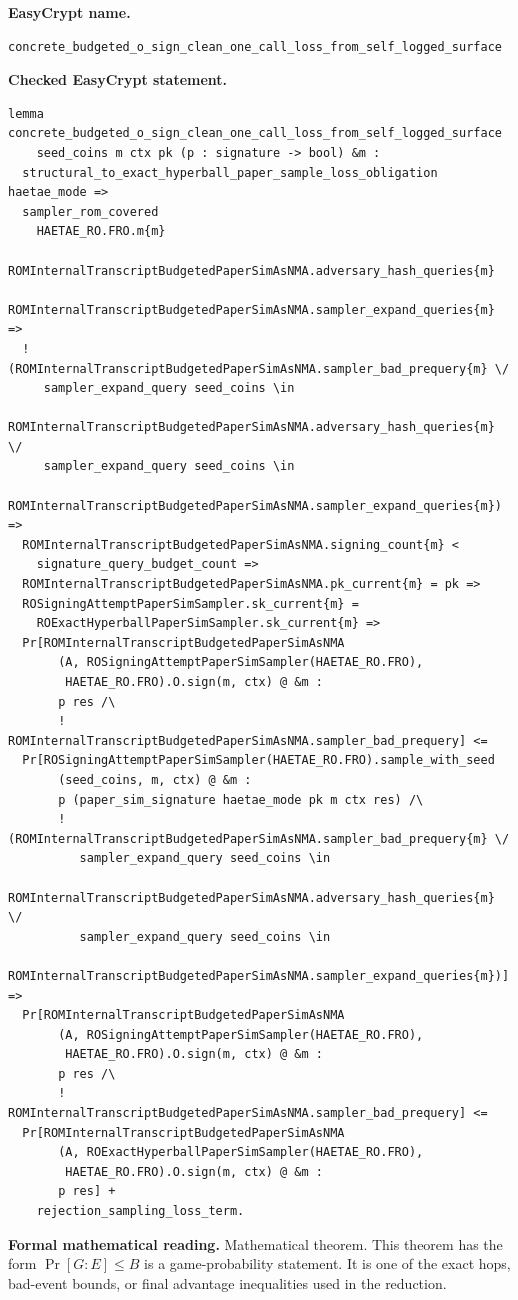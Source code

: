 \begin{formaltheorem}
\noindent\textbf{EasyCrypt name.}
\begin{lstlisting}[language=EasyCrypt,basicstyle=\ttfamily\scriptsize]
concrete_budgeted_o_sign_clean_one_call_loss_from_self_logged_surface
\end{lstlisting}
\noindent\textbf{Checked EasyCrypt statement.}
\begin{lstlisting}[language=EasyCrypt,basicstyle=\ttfamily\scriptsize]
lemma concrete_budgeted_o_sign_clean_one_call_loss_from_self_logged_surface
    seed_coins m ctx pk (p : signature -> bool) &m :
  structural_to_exact_hyperball_paper_sample_loss_obligation haetae_mode =>
  sampler_rom_covered
    HAETAE_RO.FRO.m{m}
    ROMInternalTranscriptBudgetedPaperSimAsNMA.adversary_hash_queries{m}
    ROMInternalTranscriptBudgetedPaperSimAsNMA.sampler_expand_queries{m} =>
  ! (ROMInternalTranscriptBudgetedPaperSimAsNMA.sampler_bad_prequery{m} \/
     sampler_expand_query seed_coins \in
       ROMInternalTranscriptBudgetedPaperSimAsNMA.adversary_hash_queries{m} \/
     sampler_expand_query seed_coins \in
       ROMInternalTranscriptBudgetedPaperSimAsNMA.sampler_expand_queries{m}) =>
  ROMInternalTranscriptBudgetedPaperSimAsNMA.signing_count{m} <
    signature_query_budget_count =>
  ROMInternalTranscriptBudgetedPaperSimAsNMA.pk_current{m} = pk =>
  ROSigningAttemptPaperSimSampler.sk_current{m} =
    ROExactHyperballPaperSimSampler.sk_current{m} =>
  Pr[ROMInternalTranscriptBudgetedPaperSimAsNMA
       (A, ROSigningAttemptPaperSimSampler(HAETAE_RO.FRO),
        HAETAE_RO.FRO).O.sign(m, ctx) @ &m :
       p res /\
       ! ROMInternalTranscriptBudgetedPaperSimAsNMA.sampler_bad_prequery] <=
  Pr[ROSigningAttemptPaperSimSampler(HAETAE_RO.FRO).sample_with_seed
       (seed_coins, m, ctx) @ &m :
       p (paper_sim_signature haetae_mode pk m ctx res) /\
       ! (ROMInternalTranscriptBudgetedPaperSimAsNMA.sampler_bad_prequery{m} \/
          sampler_expand_query seed_coins \in
            ROMInternalTranscriptBudgetedPaperSimAsNMA.adversary_hash_queries{m} \/
          sampler_expand_query seed_coins \in
            ROMInternalTranscriptBudgetedPaperSimAsNMA.sampler_expand_queries{m})] =>
  Pr[ROMInternalTranscriptBudgetedPaperSimAsNMA
       (A, ROSigningAttemptPaperSimSampler(HAETAE_RO.FRO),
        HAETAE_RO.FRO).O.sign(m, ctx) @ &m :
       p res /\
       ! ROMInternalTranscriptBudgetedPaperSimAsNMA.sampler_bad_prequery] <=
  Pr[ROMInternalTranscriptBudgetedPaperSimAsNMA
       (A, ROExactHyperballPaperSimSampler(HAETAE_RO.FRO),
        HAETAE_RO.FRO).O.sign(m, ctx) @ &m :
       p res] +
    rejection_sampling_loss_term.
\end{lstlisting}
\noindent\textbf{Formal mathematical reading.}
Mathematical theorem. This theorem has the form \(\Pr[G:E] \le B\) is a game-probability statement.  It is one of the exact hops, bad-event bounds, or final advantage inequalities used in the reduction.


\end{formaltheorem}
